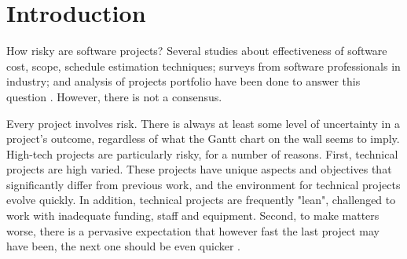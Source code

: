 \chapter{Introduction}\label{cap:introduction}

How risky are software projects? Several studies about effectiveness of software cost, scope, schedule estimation techniques; surveys from software professionals in industry; and analysis of projects portfolio have been done to answer this question \cite{budzier2013double}. However, there is not a consensus. 

Every project involves risk. There is always at least some level of uncertainty in a project's outcome, regardless of what the Gantt chart on the wall seems to imply. High-tech projects are particularly risky, for a number of reasons. First, technical projects are high varied. These projects have unique aspects and objectives that significantly differ from previous work, and the environment for technical projects evolve quickly. In addition, technical projects are frequently "lean", challenged to work with inadequate funding, staff and equipment. Second, to make matters worse, there is a pervasive expectation that however fast the last project may have been, the next one should be even quicker \cite{kendrick2003identifying}.


